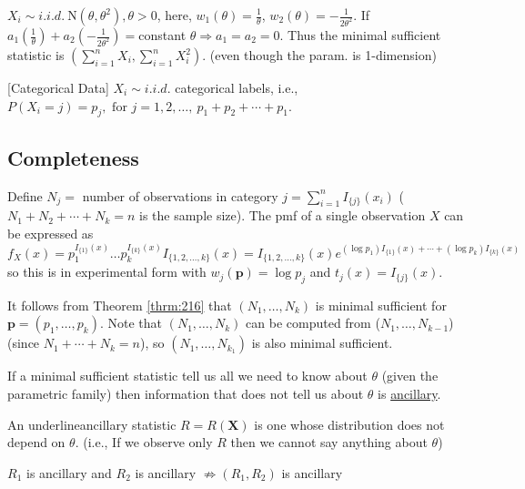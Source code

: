 \documentclass[english, 11pt]{article}
\begin{document}
\begin{exmp}
$X_i\sim i.i.d.~\text{N}(\theta, \theta^2), \theta>0$, here, $w_1(\theta)=\frac{1}{\theta}$, $w_2(\theta)=-\frac{1}{2\theta^2}$. If $a_1\left(\frac{1}{\theta}\right)+a_2\left(-\frac{1}{2\theta^2}\right)=$constant $\theta\Rightarrow a_1=a_2=0$. Thus the minimal sufficient statistic is $\left(\sum_{i=1}^nX_i, \sum_{i=1}^nX_i^2\right)$. (even though the param. is 1-dimension)
\end{exmp}

\begin{exmp}\label{exmp:218}[Categorical Data]
$X_i\sim i.i.d.$ categorical labels, i.e., $P(X_i=j)=p_j, \text{ for } j=1, 2, \dots,\ p_1+p_2+\cdots+p_1$.


\subsection{Completeness}

Define $N_j=$ number of observations in category $j=\sum_{i=1}^nI_{\{j\}}(x_i)$ ($N_1+N_2+\cdots+N_k=n$ is the sample size). The pmf of a single observation $X$ can be expressed as 
$$
f_X(x)=p_1^{I_{\{1\}}(x)}\dots p_k^{I_{\{k\}}(x)}I_{\{1, 2, \dots, k\}}(x)=I_{\{1, 2, \dots, k\}}(x)e^{(\log p_1)I_{\{1\}}(x)+\cdots+(\log p_k)I_{\{k\}}(x)}
$$
so this is in experimental form with $w_j(\bm{p})=\log p_j$ and $t_j(x)=I_{\{j\}}(x)$.

It follows from Theorem \ref{thrm:216} that $(N_1, \dots, N_k)$ is minimal sufficient for $\bm{p}=(p_1, \dots, p_k)$. Note that $(N_1, \dots, N_k)$ can be computed from ($N_1, \dots, N_{k-1}$) (since $N_1+\cdots+N_k=n$), so $(N_1, \dots, N_{k_1})$ is also minimal sufficient.
\end{exmp}

If a minimal sufficient statistic tell us all we need to know about $\theta$ (given the parametric family) then information that does not tell us about $\theta$ is \underline{ancillary}.

\begin{defn}\label{defn:219}
An underline{ancillary} statistic $R=R(\bm{X})$ is one whose distribution does not depend on $\theta$. (i.e.,  If we observe only $R$ then we cannot say anything about $\theta$)
\end{defn}

\begin{note}
$R_1$ is ancillary and $R_2$ is ancillary $\not\Rightarrow(R_1, R_2)$ is ancillary
\end{note}
\end{document}

